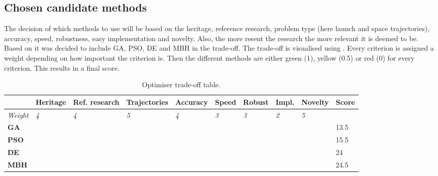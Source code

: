 \subsection{Chosen candidate methods}
\label{subsec:chocanmeth}
The decision of which methods to use will be based on the heritage, reference research, problem type (here launch and space trajectories), accuracy, speed, robustness, easy implementation and novelty. Also, the more resent the research the more relevant it is deemed to be. Based on  it was decided to include \ac{GA}, \ac{PSO}, \ac{DE} and \ac{MBH} in the trade-off. The trade-off is visualised using . Every criterion is assigned a weight depending on how important the criterion is. Then the different methods are either green (1), yellow (0.5) or red (0) for every criterion. This results in a final score. 



\begin{table}[!ht]
\begin{center}
\caption{Optimiser trade-off table.}
\label{tab:opt_trade_off}
\begin{tabular}{|l||l|l|l|l|l|l|l|l||l|}
\hline 
 &	\textbf{Heritage} & \textbf{Ref. research} & \textbf{Trajectories} & \textbf{Accuracy} & \textbf{Speed} & \textbf{Robust} & \textbf{Impl.} & \textbf{Novelty} & \textbf{Score}\\ \hline 
\textit{Weight} & \textit{4} & \textit{4} & \textit{5} & \textit{4} & \textit{3} & \textit{3} & \textit{2} & \textit{5} & \\ \hline \hline
\textbf{\ac{GA}} & \cellcolor{red} & \cellcolor{green} & \cellcolor{yellow} & \cellcolor{yellow} & \cellcolor{yellow} & \cellcolor{yellow} & \cellcolor{green} & \cellcolor{red} & 13.5 \\ \hline
\textbf{\ac{PSO}} & \cellcolor{yellow} & \cellcolor{red} & \cellcolor{yellow} & \cellcolor{yellow} & \cellcolor{green} & \cellcolor{yellow} & \cellcolor{green} & \cellcolor{yellow} &  15.5 \\ \hline
\textbf{\ac{DE}} & \cellcolor{green} & \cellcolor{green} & \cellcolor{green} & \cellcolor{yellow} & \cellcolor{yellow} & \cellcolor{green} & \cellcolor{green} & \cellcolor{yellow} & 24  \\ \hline
\textbf{\ac{MBH}} & \cellcolor{red} & \cellcolor{green} & \cellcolor{green} & \cellcolor{green} & \cellcolor{yellow} & \cellcolor{green} & \cellcolor{green} & \cellcolor{green} & 24.5 \\ \hline

\end{tabular}
\end{center}
\end{table}


